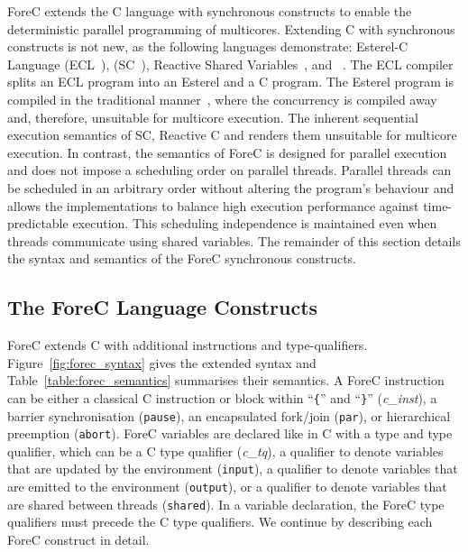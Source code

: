 ForeC extends the C language with synchronous constructs to 
enable the deterministic parallel programming of multicores.
Extending C with synchronous constructs is not new, as the 
following languages demonstrate: Esterel-C Language (ECL~\cite{timed_ecl}), 
\synchronousc{} (SC~\cite{timed_synccharts_c_proposal}), Reactive 
Shared Variables~\cite{timed_reactivec_shared_variables}, 
and \pretc{}~\cite{pret_pretc}. The ECL compiler splits an 
ECL program into an Esterel and a C program. The Esterel program
is compiled in the traditional manner~\cite{timed_compiling_esterel}, 
where the concurrency is compiled away and, therefore, unsuitable for multicore execution.
The inherent sequential execution semantics of SC, Reactive C 
and \pretc{} renders them unsuitable for multicore execution. In
contrast, the semantics of ForeC is designed for parallel 
execution and does not impose
a scheduling order on parallel threads. Parallel threads can
be scheduled in an arbitrary order without altering the program's 
behaviour and allows the implementations to balance high execution 
performance against time-predictable execution. This scheduling 
independence is maintained even when threads communicate using 
shared variables. The remainder of this section details the 
syntax and semantics of the ForeC synchronous constructs.



\subsection{The ForeC Language Constructs}
ForeC extends C with additional instructions and type-qualifiers.
Figure~\ref{fig:forec_syntax} gives the extended syntax and 
Table~\ref{table:forec_semantics} summarises their semantics.  
A ForeC instruction can be either a classical C instruction or 
block within ``\verb${$'' and ``\verb$}$'' (\emph{c\_inst}), a
barrier synchronisation (\verb$pause$), an encapsulated fork/join
(\verb$par$), or hierarchical preemption (\verb$abort$). ForeC
variables are declared like in C with a type and type qualifier, 
which can be a C type qualifier (\emph{c\_tq}), a qualifier to 
denote variables that are updated by the environment (\verb$input$), a 
qualifier to denote variables that are emitted to the
environment (\verb$output$), or a qualifier to denote variables
that are shared between threads (\verb$shared$). In a variable 
declaration, the ForeC type qualifiers must precede the C type 
qualifiers. We continue by describing each ForeC construct in detail.

